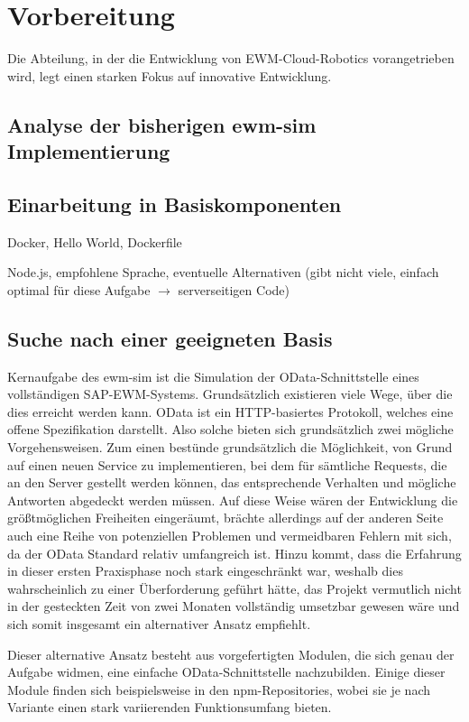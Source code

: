 \chapter{Vorbereitung}
Die Abteilung, in der die Entwicklung von \ac{EWM}-Cloud-Robotics vorangetrieben wird, legt einen starken Fokus auf innovative Entwicklung.

\section{Analyse der bisherigen ewm-sim Implementierung}

\section{Einarbeitung in Basiskomponenten}
Docker, Hello World, Dockerfile

Node.js, empfohlene Sprache, eventuelle Alternativen (gibt nicht viele, einfach optimal für diese Aufgabe $\rightarrow$ serverseitigen Code)

\section{Suche nach einer geeigneten Basis}
Kernaufgabe des \ac{ewm-sim} ist die Simulation der OData-Schnittstelle eines vollständigen SAP-EWM-Systems.
Grundsätzlich existieren viele Wege, über die dies erreicht werden kann.
OData ist ein HTTP-basiertes Protokoll, welches eine offene Spezifikation darstellt.
Also solche bieten sich grundsätzlich zwei mögliche Vorgehensweisen.
Zum einen bestünde grundsätzlich die Möglichkeit, von Grund auf einen neuen Service zu implementieren, bei dem für sämtliche Requests, die an den Server gestellt werden können, das entsprechende Verhalten und mögliche Antworten abgedeckt werden müssen.
Auf diese Weise wären der Entwicklung die größtmöglichen Freiheiten eingeräumt, brächte allerdings auf der anderen Seite auch eine Reihe von potenziellen Problemen und vermeidbaren Fehlern mit sich, da der OData Standard relativ umfangreich ist.
Hinzu kommt, dass die Erfahrung in dieser ersten Praxisphase noch stark eingeschränkt war, weshalb dies wahrscheinlich zu einer Überforderung geführt hätte, das Projekt vermutlich nicht in der gesteckten Zeit von zwei Monaten vollständig umsetzbar gewesen wäre und sich somit insgesamt ein alternativer Ansatz empfiehlt.

Dieser alternative Ansatz besteht aus vorgefertigten Modulen, die sich genau der Aufgabe widmen, eine einfache OData-Schnittstelle nachzubilden.
Einige dieser Module finden sich beispielsweise in den \ac{npm}-Repositories, wobei sie je nach Variante einen stark variierenden Funktionsumfang bieten.
